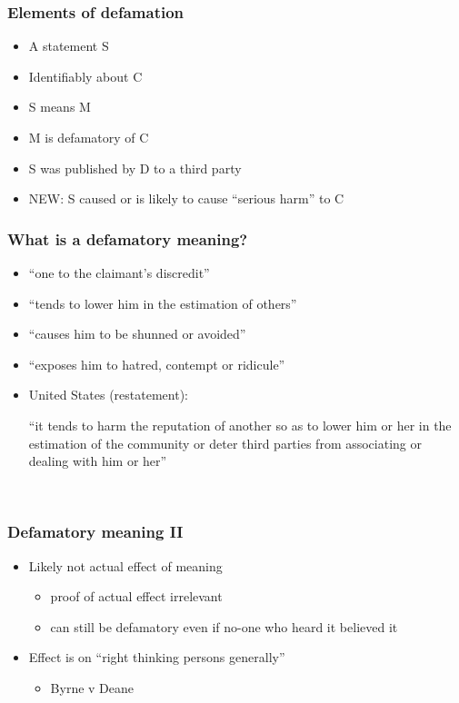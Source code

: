 \documentclass[ignorenonframetext,]{beamer}
\begin{document}
\begin{frame}
\frametitle{Elements of defamation}

\begin{itemize}
\item  A statement S
\item  Identifiably about C
\item  S means M
\item  M is defamatory of C
\item  S was published by D to a third party
\item  NEW: S caused or is likely to cause ``serious harm'' to C
\end{itemize}

\end{frame}

\begin{frame}
\frametitle{What is a defamatory meaning?}

\begin{itemize}
\item  ``one to the claimant's discredit''
\item  ``tends to lower him in the estimation of others''
\item  ``causes him to be shunned or avoided''
\item  ``exposes him to hatred, contempt or ridicule''
\item  United States (restatement):

  {}``it tends to harm the reputation of another so as to lower him or
  her in the estimation of the community or deter third parties from
  associating or dealing with him or her''
\end{itemize}

~


\end{frame}

\begin{frame}
\frametitle{Defamatory meaning II}

\begin{itemize}
\item  {Likely} not {actual} effect of meaning

  \begin{itemize}
  \item    proof of actual effect irrelevant
  \item    can still be defamatory even if no-one who heard it believed
    it
  \end{itemize}
\item  Effect is on ``right thinking persons generally''

  \begin{itemize}
  \item    Byrne v Deane
  \end{itemize}
\end{itemize}

~


\end{frame}
\end{document}
